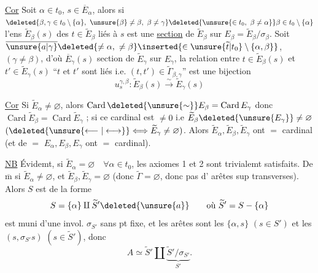 \uline{Cor} \quad Soit $\alpha\in t_0$, $s\in\overline E_\alpha$, alors si $\deleted{\beta,\gamma\in t_0\setminus\{\alpha\},\ \unsure{\beta}\ne\beta,\ \beta\ne\gamma}\deleted{\unsure{\in t_0,\ \beta\ne\alpha}}\beta\in t_0\setminus\{\alpha\}$ l'ens $\widetilde E_\beta(s)$  des $t\in\widetilde E_\beta$  liés à $s$ est une \uline{section} de $\widetilde E_\beta$ sur $E_\beta=\widetilde E_\beta/\sigma_\beta$. Soit  $\overline{\unsure{a|\gamma}}\deleted{\ne\alpha,\ \ne\beta}\inserted{\in\unsure{\widetilde t|t_0}\setminus\{\alpha,\beta\}}$, $(\gamma\ne\beta)$, d'où $\overline E_\gamma(s)$ section de $\widetilde E_\gamma$ sur $E_\gamma$, la relation entre $t\in\widetilde E_\beta(s)$ et $t'\in\widetilde E_\gamma(s)$ ``$t$ et $t'$ sont liés i.e. $(t,t')\in\widetilde\Gamma_{\beta,\gamma}$'' est une bijection 
\[
u_s^{\gamma,\beta}:\widetilde E_\beta(s)\xrightarrow{\sim}\widetilde E_\gamma(s)
\]

\uline{Cor} \quad Si  $\widetilde E_\alpha\ne\varnothing$, alors $\operatorname{Card}\deleted{\unsure{\sim}}E_\beta=\operatorname{Card}E_\gamma$ donc $\operatorname{Card}\widetilde E_\beta=\operatorname{Card}\widetilde E_\gamma$ ; si ce  cardinal est $\ne0$ i.e $\widetilde E_\beta\deleted{\unsure{E_\gamma}}\ne\varnothing$ $(\deleted{\unsure{\longleftarrow|\longleftrightarrow}}\Longleftrightarrow\widetilde E_\gamma\ne\varnothing)$. Alors $\widetilde E_\alpha,\widetilde E_\beta,\widetilde E_\gamma$ ont $=$ cardinal (et de $=$ $E_\alpha,E_\beta,E_\gamma$ ont $=$ cardinal).

\uline{NB} \inserted{\unsure{$\times$}}Évidemt, si $\widetilde E_\alpha=\varnothing\quad\forall\alpha\in t_0$, les axiomes  1 et 2 sont trivialemt satisfaits. De $\overline{\mathrm m}$ si $\widetilde E_\alpha\ne\varnothing$, et $\widetilde E_\beta,\widetilde E_\gamma=\varnothing$ (donc $\widetilde\Gamma=\varnothing$, donc pas d'  arêtes sup transverses). Alors  $S$ est  de la forme
\[
S=\{\alpha\}\amalg\widetilde S'\deleted{\unsure{a}}\qquad\text{où }\widetilde S'=S-\{\alpha\}
\]
est muni d'une invol. $\sigma_{S'}$ sans pt fixe, et les arêtes sont les $\{\alpha,s\}$ $(s\in S')$ et les $(s,\sigma_{S'}s)$ $(s\in\widetilde S')$, donc
\[
A\simeq\widetilde S'\amalg\underbrace{\widetilde S'/\sigma_{S'}}_{S'}.
\]
